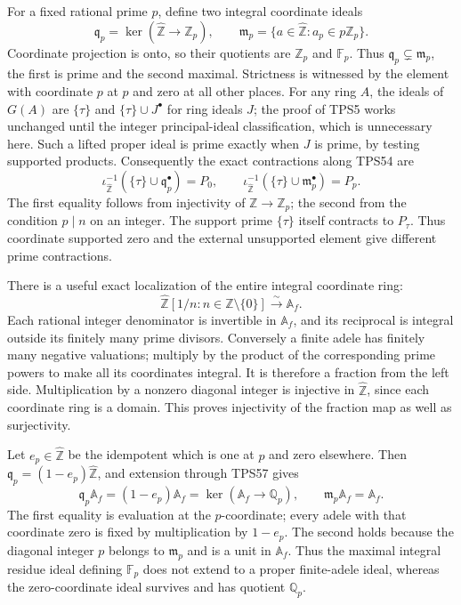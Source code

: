 \documentclass[
  10pt,
]{article}
\begin{document}
For a fixed rational prime \(p\), define two integral coordinate ideals
\[
\mathfrak q_p=\ker(\widehat{\mathbb Z}\to\mathbb Z_p),\qquad
\mathfrak m_p=\{a\in\widehat{\mathbb Z}:a_p\in p\mathbb Z_p\}.
\tag{TPS55}
\] Coordinate projection is onto, so their quotients are \(\mathbb Z_p\)
and \(\mathbb F_p\). Thus \(\mathfrak q_p\subsetneq\mathfrak m_p\), the
first is prime and the second maximal. Strictness is witnessed by the
element with coordinate \(p\) at \(p\) and zero at all other places. For
any ring \(A\), the ideals of \(G(A)\) are \(\{\tau\}\) and
\(\{\tau\}\cup J^\bullet\) for ring ideals \(J\); the proof of TPS5
works unchanged until the integer principal-ideal classification, which
is unnecessary here. Such a lifted proper ideal is prime exactly when
\(J\) is prime, by testing supported products. Consequently the exact
contractions along TPS54 are \[
\boxed{\iota_{\widehat{\mathbb Z}}^{-1}(\{\tau\}\cup\mathfrak q_p^\bullet)=P_0,
\qquad
\iota_{\widehat{\mathbb Z}}^{-1}(\{\tau\}\cup\mathfrak m_p^\bullet)=P_p.}
\tag{TPS56}
\] The first equality follows from injectivity of
\(\mathbb Z\to\mathbb Z_p\); the second from the condition \(p\mid n\)
on an integer. The support prime \(\{\tau\}\) itself contracts to
\(P_\tau\). Thus coordinate supported zero and the external unsupported
element give different prime contractions.

There is a useful exact localization of the entire integral coordinate
ring: \[
\widehat{\mathbb Z}[1/n:n\in\mathbb Z\setminus\{0\}]
\xrightarrow{\sim}\mathbb A_f.
\tag{TPS57}
\] Each rational integer denominator is invertible in \(\mathbb A_f\),
and its reciprocal is integral outside its finitely many prime divisors.
Conversely a finite adele has finitely many negative valuations;
multiply by the product of the corresponding prime powers to make all
its coordinates integral. It is therefore a fraction from the left side.
Multiplication by a nonzero diagonal integer is injective in
\(\widehat{\mathbb Z}\), since each coordinate ring is a domain. This
proves injectivity of the fraction map as well as surjectivity.

Let \(e_p\in\widehat{\mathbb Z}\) be the idempotent which is one at
\(p\) and zero elsewhere. Then
\(\mathfrak q_p=(1-e_p)\widehat{\mathbb Z}\), and extension through
TPS57 gives \[
\mathfrak q_p\mathbb A_f=(1-e_p)\mathbb A_f
=\ker(\mathbb A_f\to\mathbb Q_p),\qquad
\mathfrak m_p\mathbb A_f=\mathbb A_f.
\tag{TPS58}
\] The first equality is evaluation at the \(p\)-coordinate; every adele
with that coordinate zero is fixed by multiplication by \(1-e_p\). The
second holds because the diagonal integer \(p\) belongs to
\(\mathfrak m_p\) and is a unit in \(\mathbb A_f\). Thus the maximal
integral residue ideal defining \(\mathbb F_p\) does not extend to a
proper finite-adele ideal, whereas the zero-coordinate ideal survives
and has quotient \(\mathbb Q_p\).
\end{document}
